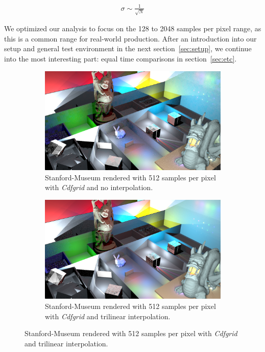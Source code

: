 \begin{align}\label{eq:sigmaCor}
\sigma \sim \frac{1}{\sqrt{N}}
\end{align}

We optimized our analysis to focus on the 128 to 2048 samples per pixel range, as this is a common range for real-world production. After an introduction into our setup and general test environment in the next section~\ref{sec:setup}, we continue into the most interesting part: equal time comparisons in section~\ref{sec:etc}.


\begin{figure}
\centering
\begin{subfigure}[b]{1\textwidth}
   \includegraphics[width=1\linewidth]{figures/examples/StanfordMuseum_pvox_ps512_t503_icdf-0_pc96000k_mc0,1_Vox96_8854.png}
   \caption{Stanford-Museum rendered with 512 samples per pixel with \textit{Cdfgrid} and no interpolation.}
   \label{fig:SMnoInt} 
\end{subfigure}

\begin{subfigure}[b]{1\textwidth}
   \includegraphics[width=1\linewidth]{figures/examples/StanfordMuseum_pvox_ps512_t723_icdf-1_pc128000k_mc0,1_Vox64_17574.png}
   \caption{Stanford-Museum rendered with 512 samples per pixel with \textit{Cdfgrid} and trilinear interpolation.}
   \label{fig:SMInt}
\end{subfigure}


\end{figure}
